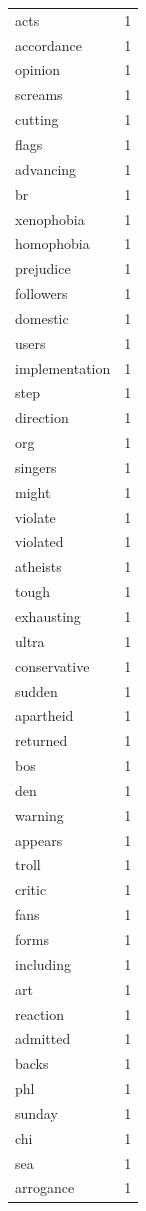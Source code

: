 \begin{tabular}{lr}
acts & 1 \\
accordance & 1 \\
opinion & 1 \\
screams & 1 \\
cutting & 1 \\
flags & 1 \\
advancing & 1 \\
br & 1 \\
xenophobia & 1 \\
homophobia & 1 \\
prejudice & 1 \\
followers & 1 \\
domestic & 1 \\
users & 1 \\
implementation & 1 \\
step & 1 \\
direction & 1 \\
org & 1 \\
singers & 1 \\
might & 1 \\
violate & 1 \\
violated & 1 \\
atheists & 1 \\
tough & 1 \\
exhausting & 1 \\
ultra & 1 \\
conservative & 1 \\
sudden & 1 \\
apartheid & 1 \\
returned & 1 \\
bos & 1 \\
den & 1 \\
warning & 1 \\
appears & 1 \\
troll & 1 \\
critic & 1 \\
fans & 1 \\
forms & 1 \\
including & 1 \\
art & 1 \\
reaction & 1 \\
admitted & 1 \\
backs & 1 \\
phl & 1 \\
sunday & 1 \\
chi & 1 \\
sea & 1 \\
arrogance & 1 \\

\end{tabular}
